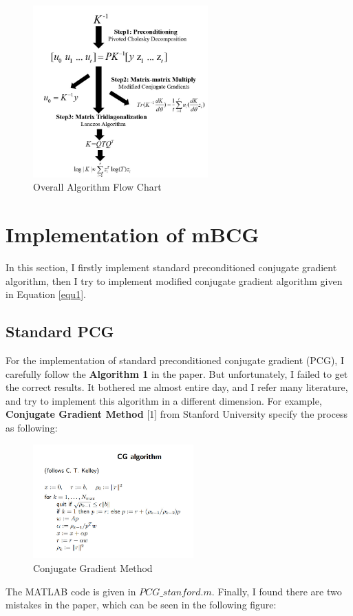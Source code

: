 \documentclass{article} %
\newcounter{other}
\begin{document}
 \begin{figure}[h]
	\begin{center}
		\includegraphics[width=0.6\textwidth]{algorithm}
	\end{center}
	\caption{Overall Algorithm Flow Chart}
	\label{fig1}
\end{figure}

\section{Implementation of mBCG}
In this section, I firstly implement standard preconditioned conjugate gradient algorithm, then I try to implement modified conjugate gradient algorithm given in Equation \ref{equ1}. 
\subsection{Standard PCG}
For the implementation of standard preconditioned conjugate gradient (PCG), I carefully follow the \textbf{Algorithm 1} in the paper. But unfortunately, I failed to get the correct results. It bothered me almost entire day, and I refer many literature, and try to implement this algorithm in a different dimension. For example, \textbf{Conjugate Gradient Method} [1] from Stanford University specify the process as following: 

 \begin{figure}[H]
	\begin{center}
		\includegraphics[width=0.55\textwidth]{CG}
	\end{center}
	\caption{Conjugate Gradient Method}
	\label{fig2}
\end{figure}
The MATLAB code is given in $PCG\_stanford.m$. Finally, I found there are two mistakes in the paper, which can be seen in the following figure:
\end{document}
